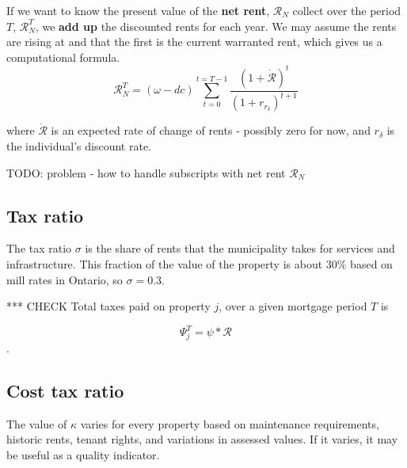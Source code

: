 If we want to know the  present value  of the \textbf{net rent}, $\mathcal{R}_N$  collect over the period  $T$, $\mathcal{R}_N^T$, we \textbf{add up} the discounted rents for each year. We may assume the rents are rising at and that the first is the current warranted rent, which gives us a computational formula. 
\[\mathcal{R}_N^T= (\omega-dc)\sum_{t=0}^{t=T-1} \frac{(1+\dot{\mathcal{R}})^{t}} {(1+r_{r_\delta})^{t+1}} \]

\noindent where $\dot{\mathcal{R}}$ is an expected rate of change of rents - possibly zero for now, and $r_\delta$ is the individual's discount rate. 

TODO: problem - how to handle subscripts with net rent $\mathcal{R}_N$


\subsection{Tax ratio}\label{SS:TaxRatio} 
The tax ratio $\sigma$ is the share of rents that the municipality takes for services and infrastructure. This fraction of the value of the property is about 30\% based on mill rates in Ontario,  so $\sigma = 0.3$. %

*** CHECK Total taxes paid on  property $j$, over a given mortgage period $T$ is 

\[\Psi_j^T = \psi * \mathcal{R}\].  




\subsection{Cost tax ratio}\label{SS:CostRatio} 
The value of $\kappa$  varies for every property based on maintenance requirements, historic rents, tenant rights, and variations in assessed values. If it varies, it may be useful as a quality indicator.


